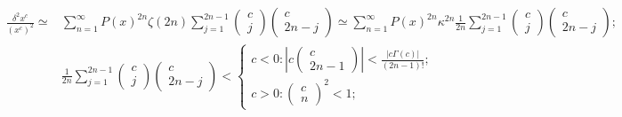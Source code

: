 \documentclass[twoside]{article}
\numberwithin{equation}{section}
\begin{document}
\begin{align}
\label{eqn: pow convergence}
\frac{\delta^2 x^c}{(x^c)^2} \simeq& \sum_{n=1}^{\infty} P(x)^{2n} \zeta(2n) 
 		\sum_{j=1}^{2n-1} \begin{pmatrix} c \\ j \end{pmatrix} \begin{pmatrix} c \\ 2n - j \end{pmatrix}
 		\simeq \sum_{n=1}^{\infty} P(x)^{2n} \kappa^{2n} \frac{1}{2n}\sum_{j=1}^{2n-1} 
 				\begin{pmatrix} c \\ j \end{pmatrix} \begin{pmatrix} c \\ 2n - j \end{pmatrix}; \nonumber \\
	&\frac{1}{2n} \sum_{j=1}^{2n-1} \begin{pmatrix} c \\ j \end{pmatrix} \begin{pmatrix} c \\ 2n - j \end{pmatrix} 	< 
 		\begin{cases}		
 			c < 0:	\left| c  \begin{pmatrix} c \\ 2n - 1 \end{pmatrix} \right| < \frac{\left| c \Gamma(c) \right|}{(2n - 1) !}; \\
 			c > 0:	\begin{pmatrix} c \\ n \end{pmatrix}^2 < 1;
 		\end{cases}
\end{align}


\fi
\end{document}
